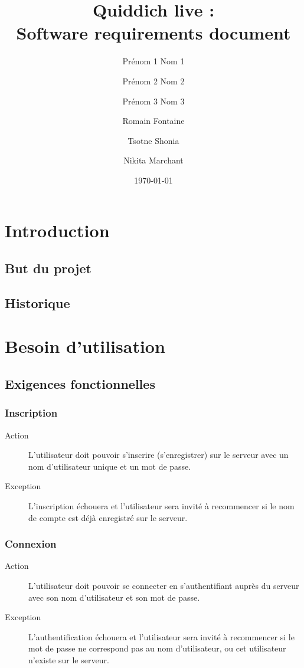 \documentclass[a4paper]{article}
\title{Quiddich live : \\Software requirements document}
\author{Prénom 1 Nom 1 \and Prénom 2 Nom 2 \and Prénom 3 Nom 3 \and
Romain Fontaine \and Tsotne Shonia \and Nikita Marchant}
\date{\today}
\begin{document}
\maketitle

\section{Introduction}
\subsection{But du projet}

\printglossary[numberedsection]
\subsection{Historique}

\section{Besoin d'utilisation}
\subsection{Exigences fonctionnelles}

\subsubsection{Inscription}
\begin{description}
\item[Action] L'\gls{utilisateur} doit pouvoir s'inscrire (s'enregistrer) sur le \gls{serveur} avec un nom d'utilisateur unique et un mot de passe.
\item[Exception] L'inscription échouera et l'\gls{utilisateur} sera invité à recommencer si le nom de compte est déjà enregistré sur le \gls{serveur}.
\end{description}

\subsubsection{Connexion}
\begin{description}
\item[Action] L'\gls{utilisateur} doit pouvoir se connecter en s'authentifiant auprès du \gls{serveur} avec son nom d'utilisateur et son mot de passe.
\item[Exception] L'authentification échouera et l'\gls{utilisateur} sera invité à recommencer si le mot de passe ne correspond pas au nom d'utilisateur, ou cet \gls{utilisateur} n'existe sur le \gls{serveur}.
\end{description}
\end{document}
